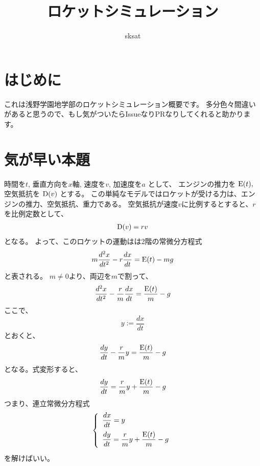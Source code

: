\documentclass{jsarticle}
\begin{document}
%
\title{ロケットシミュレーション}
\author{sksat}
\maketitle
%
\section{はじめに}
%
これは浅野学園地学部のロケットシミュレーション概要です。%
多分色々間違いがあると思うので、もし気がついたらIssueなりPRなりしてくれると助かります。
%
\section{気が早い本題}
%
時間を$t$, 垂直方向を$x$軸, 速度を$v$, 加速度を$a$ として、
エンジンの推力を ${\rm E}(t),$
空気抵抗を ${\rm D}(v)$ とする。
%
この単純なモデルではロケットが受ける力は、エンジンの推力、空気抵抗、重力である。
%
空気抵抗が速度$v$に比例するとすると、$r$を比例定数として、
\begin{align}%
	{\rm D}(v) = r v
\end{align}
%
となる。
%
よって、このロケットの運動はは2階の常微分方程式
\begin{align}%
	m \dfrac{d^2x}{dt^2} - r \dfrac{dx}{dt} = {\rm E}(t) - mg
\end{align}
%
と表される。
%
$m \neq 0$より、両辺を$m$で割って、
\begin{align}
	\dfrac{d^2x}{dt^2} - \dfrac{r}{m} \dfrac{dx}{dt} = \dfrac{{\rm E}(t)}{m} - g
\end{align}
%
ここで、
\begin{equation}
	y := \dfrac{dx}{dt}
\end{equation}
%
とおくと、
%
\begin{align}
	\dfrac{dy}{dt} - \dfrac{r}{m} y = \dfrac{{\rm E}(t)}{m} -g
\end{align}
となる。式変形すると、
\begin{align}
	\dfrac{dy}{dt} = \dfrac{r}{m} y + \dfrac{{\rm E}(t)}{m} -g
\end{align}
%
つまり、連立常微分方程式
\begin{align}
	\left\{
		\begin{array}{l}
			\dfrac{dx}{dt} = y \vspace{2mm}\\
			\dfrac{dy}{dt} = \dfrac{r}{m} y + \dfrac{{\rm E}(t)}{m} -g \vspace{1mm}
		\end{array}
	\right.
\end{align}
%
を解けばいい。
%
\end{document}

